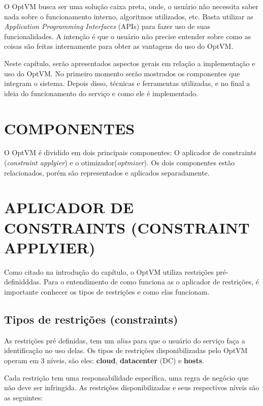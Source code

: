 O OptVM busca ser uma solução caixa preta, onde, o usuário não necessita saber nada sobre o funcionamento interno, 
algoritmos utilizados, etc. Basta utilizar as \textit{Application Programming Interfaces} (APIs) para fazer uso de suas funcionalidades.
A intenção é que o usuário não precise entender sobre como as coisas são feitas internamente para obter as vantagens do uso do OptVM.

Neste capítulo, serão apresentados aspectos gerais em relação a implementação e uso do OptVM. 
No primeiro momento serão mostrados os componentes que integram o sistema. 
Depois disso, técnicas e ferramentas utilizadas, e no final a ideia do funcionamento do serviço e como ele é
implementado.

\section{COMPONENTES}
O OptVM é dividido em dois principais componentes: O aplicador de constraints (\textit{constraint applyier})
e o otimizador(\textit{optmizer}). Os dois componentes estão relacionados, porém são representados e 
aplicados separadamente. 

\section{APLICADOR DE CONSTRAINTS (CONSTRAINT APPLYIER)}

Como citado na introdução do capítulo, o OptVM utiliza restrições pré-definidddas.
Para o entendimento de como funciona as o aplicador de restrições, é importante conhecer os tipos de 
restrições e como elas funcionam.

\subsection{Tipos de restrições (constraints)}

As restrições pré definidas, tem um \textit{alias} para que o usuário do serviço faça a identificação no uso delas.
Os tipos de restrições disponibilizadas pelo OptVM operam em 3 níveis, são eles: \textbf{cloud}, \textbf{datacenter} (DC)
e \textbf{hosts}.

Cada restrição tem uma responsabilidade específica, uma regra de negócio que não deve ser infringida. 
As restrições disponibilizadas e seus respectivos níveis são as seguintes:

